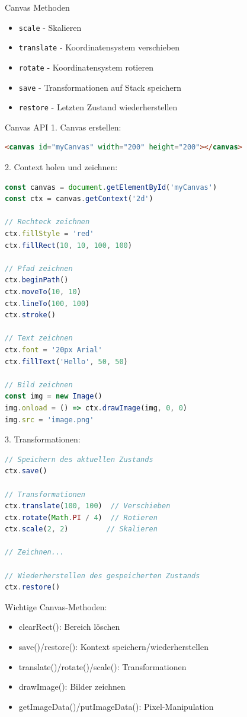\begin{code}{Canvas Methoden}
  \begin{itemize}
    \item \texttt{scale} - Skalieren
    \item \texttt{translate} - Koordinatensystem verschieben
    \item \texttt{rotate} - Koordinatensystem rotieren
    \item \texttt{save} - Transformationen auf Stack speichern
    \item \texttt{restore} - Letzten Zustand wiederherstellen
  \end{itemize}  
\end{code}


\begin{KR}{Canvas API}
1. Canvas erstellen:
\begin{lstlisting}[language=HTML, style=basesmol]
<canvas id="myCanvas" width="200" height="200"></canvas>
\end{lstlisting}

2. Context holen und zeichnen:
\begin{lstlisting}[language=JavaScript, style=basesmol]
const canvas = document.getElementById('myCanvas')
const ctx = canvas.getContext('2d')

// Rechteck zeichnen
ctx.fillStyle = 'red'
ctx.fillRect(10, 10, 100, 100)

// Pfad zeichnen
ctx.beginPath()
ctx.moveTo(10, 10)
ctx.lineTo(100, 100)
ctx.stroke()

// Text zeichnen
ctx.font = '20px Arial'
ctx.fillText('Hello', 50, 50)

// Bild zeichnen
const img = new Image()
img.onload = () => ctx.drawImage(img, 0, 0)
img.src = 'image.png'
\end{lstlisting}

3. Transformationen:
\begin{lstlisting}[language=JavaScript, style=basesmol]
// Speichern des aktuellen Zustands
ctx.save()

// Transformationen
ctx.translate(100, 100)  // Verschieben
ctx.rotate(Math.PI / 4)  // Rotieren
ctx.scale(2, 2)         // Skalieren

// Zeichnen...

// Wiederherstellen des gespeicherten Zustands
ctx.restore()
\end{lstlisting}

Wichtige Canvas-Methoden:
\begin{itemize}
  \item clearRect(): Bereich löschen
  \item save()/restore(): Kontext speichern/wiederherstellen
  \item translate()/rotate()/scale(): Transformationen
  \item drawImage(): Bilder zeichnen
  \item getImageData()/putImageData(): Pixel-Manipulation
\end{itemize}
\end{KR}







